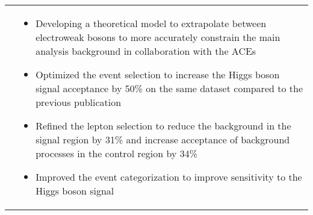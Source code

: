 \documentclass[a4paper,10pt]{article}
\begin{document}
\begin{tabularx}{\textwidth}{>{\centering\arraybackslash}X p{} }
			& \begin{itemize}
				\item Developing a theoretical model to extrapolate between electroweak bosons to more accurately constrain the main analysis background in collaboration with the ACEs
				\item Optimized the event selection to increase the Higgs boson signal acceptance by 50\% on the same dataset compared to the previous publication
				\item Refined the lepton selection to reduce the background in the signal region by 31\% and increase acceptance of background processes in the control region by 34\%
				\item Improved the event categorization to improve sensitivity to the Higgs boson signal
			  \end{itemize}\\[-1.5ex]
\end{tabularx}


\vspace{3mm}
\end{document}
